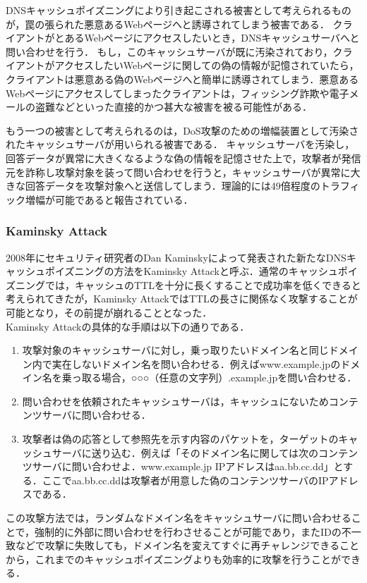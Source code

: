 DNSキャッシュポイズニングにより引き起こされる被害として考えられるものが，罠の張られた悪意あるWebページへと誘導されてしまう被害である．
クライアントがとあるWebページにアクセスしたいとき，DNSキャッシュサーバへと問い合わせを行う．
もし，このキャッシュサーバが既に汚染されており，クライアントがアクセスしたいWebページに関しての偽の情報が記憶されていたら，クライアントは悪意ある偽のWebページへと簡単に誘導されてしまう．悪意あるWebページにアクセスしてしまったクライアントは，フィッシング詐欺や電子メールの盗難などといった直接的かつ甚大な被害を被る可能性がある．

もう一つの被害として考えられるのは，DoS攻撃のための増幅装置として汚染されたキャッシュサーバが用いられる被害である．
キャッシュサーバを汚染し，回答データが異常に大きくなるような偽の情報を記憶させた上で，攻撃者が発信元を詐称し攻撃対象を装って問い合わせを行うと，キャッシュサーバが異常に大きな回答データを攻撃対象へと送信してしまう．理論的には49倍程度のトラフィック増幅が可能であると報告されている．\cite{ipa}

\subsubsection{Kaminsky Attack}
2008年にセキュリティ研究者のDan Kaminskyによって発表された新たなDNSキャッシュポイズニングの方法をKaminsky Attackと呼ぶ．\cite{kaminsky}通常のキャッシュポイズニングでは，キャッシュのTTLを十分に長くすることで成功率を低くできると考えられてきたが，Kaminsky AttackではTTLの長さに関係なく攻撃することが可能となり，その前提が崩れることとなった．\\
Kaminsky Attackの具体的な手順は以下の通りである．

\begin{enumerate}
	\item 攻撃対象のキャッシュサーバに対し，乗っ取りたいドメイン名と同じドメイン内で実在しないドメイン名を問い合わせる．例えばwww.example.jpのドメイン名を乗っ取る場合，○○○（任意の文字列）.example.jpを問い合わせる．
	\item 問い合わせを依頼されたキャッシュサーバは，キャッシュにないためコンテンツサーバに問い合わせる．
	\item 攻撃者は偽の応答として参照先を示す内容のパケットを，ターゲットのキャッシュサーバに送り込む．例えば「そのドメイン名に関しては次のコンテンツサーバに問い合わせよ．www.example.jp IPアドレスはaa.bb.cc.dd」とする．ここでaa.bb.cc.ddは攻撃者が用意した偽のコンテンツサーバのIPアドレスである．
\end{enumerate}

この攻撃方法では，ランダムなドメイン名をキャッシュサーバに問い合わせることで，強制的に外部に問い合わせを行わさせることが可能であり，またIDの不一致などで攻撃に失敗しても，ドメイン名を変えてすぐに再チャレンジできることから，これまでのキャッシュポイズニングよりも効率的に攻撃を行うことができる．

